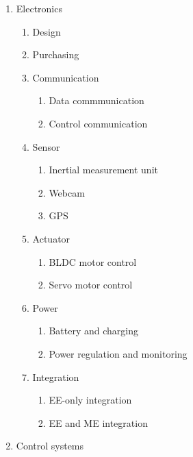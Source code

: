 \documentclass[a4paper, 10pt, twocolumn, titlepage]{article}
\begin{document}
\begin{enumerate}
\itemsep-0.5mm
  \item Electronics
    \begin{enumerate}
    \itemsep-0.5mm
      \item Design  \label{wbs:ee_design}
      \item Purchasing \label{wbs:ee_purchasing}
      \item Communication  \label{wbs:ee_comm}
        \begin{enumerate}
        \itemsep-0.5mm
          \item Data commmunication
          \item Control communication
        \end{enumerate}
      \item Sensor \label{wbs:ee_sensor}
        \begin{enumerate}
        \itemsep-0.5mm
          \item Inertial measurement unit
          \item Webcam
          \item GPS
        \end{enumerate}
      \item Actuator  \label{wbs:ee_actuator}
        \begin{enumerate}
        \itemsep-0.5mm
          \item BLDC motor control
          \item Servo motor control
        \end{enumerate}
      \item Power  \label{wbs:ee_pwr}
        \begin{enumerate}
        \itemsep-0.5mm
          \item Battery and charging
          \item Power regulation and monitoring
        \end{enumerate}
      \item Integration
        \begin{enumerate}
        \itemsep-0.5mm
          \item EE-only integration  \label{wbs:ee_int}
          \item EE and ME integration \label{wbs:ee-me_int}
        \end{enumerate}
    \end{enumerate}
  \item Control systems
    \begin{enumerate}

\end{enumerate}
\end{enumerate}
\end{document}
